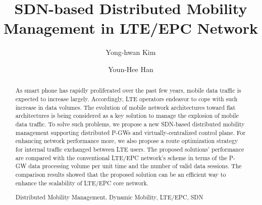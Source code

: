 \documentclass[runningheads,a4paper]{llncs}
\newcommand{\keywords}[1]{\par\addvspace\baselineskip
\noindent\keywordname\enspace\ignorespaces#1}
\begin{document}
\mainmatter  %

\title{SDN-based Distributed Mobility Management in LTE/EPC Network}


%
%

\author{Yong-hwan Kim\inst{}
\and Youn-Hee Han\inst{}}
%


%
%

\maketitle


\begin{abstract}
As smart phone has rapidly proliferated over the past few years, mobile data traffic is expected to increase largely. Accordingly, LTE operators endeavor to cope with such increase in data volumes. The evolution of mobile network architectures toward flat architectures is being considered as a key solution to manage the explosion of mobile data traffic. To solve such problems, we propose a new SDN-based distributed mobility management supporting distributed P-GWs and virtually-centralized control plane. For enhancing network performance more, we also propose a route optimization strategy for internal traffic exchanged between LTE users. The proposed solutions' performance are compared with the conventional LTE/EPC network's scheme in terms of the P-GW data processing volume per unit time and the number of valid data sessions. The comparison results showed that the proposed solution can be an efficient way to enhance the scalability of LTE/EPC core network.

\keywords{Distributed Mobility Management, Dynamic Mobility, LTE/EPC, SDN}
\end{abstract}
\end{document}
